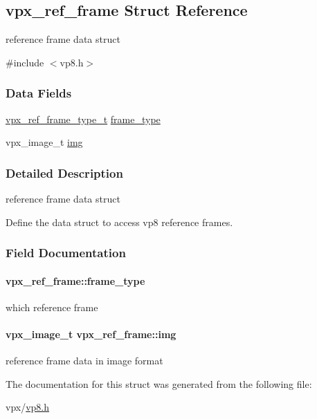 \hypertarget{structvpx__ref__frame}{\subsection{vpx\-\_\-ref\-\_\-frame \-Struct \-Reference}
\label{structvpx__ref__frame}
}


reference frame data struct  




{\ttfamily \#include $<$vp8.\-h$>$}

\subsubsection*{\-Data \-Fields}
\begin{DoxyCompactItemize}
\item 
\hyperlink{group__vp8_ga75ac0689a81bf7202382a225c5b451b4}{vpx\-\_\-ref\-\_\-frame\-\_\-type\-\_\-t} \hyperlink{structvpx__ref__frame_a7fbe51de592d0ff16d9fbd4d2b367c9b}{frame\-\_\-type}
\item 
vpx\-\_\-image\-\_\-t \hyperlink{structvpx__ref__frame_a972d24d0243f51f84eef7e1b79c6c414}{img}
\end{DoxyCompactItemize}


\subsubsection{\-Detailed \-Description}
reference frame data struct 

\-Define the data struct to access vp8 reference frames. 

\subsubsection{\-Field \-Documentation}
\hypertarget{structvpx__ref__frame_a7fbe51de592d0ff16d9fbd4d2b367c9b}{
\paragraph[{frame\-\_\-type}]{ {\bf vpx\-\_\-ref\-\_\-frame\-::frame\-\_\-type}}}\label{structvpx__ref__frame_a7fbe51de592d0ff16d9fbd4d2b367c9b}
which reference frame \hypertarget{structvpx__ref__frame_a972d24d0243f51f84eef7e1b79c6c414}{
\paragraph[{img}]{\setlength{\rightskip}{0pt plus 5cm}vpx\-\_\-image\-\_\-t {\bf vpx\-\_\-ref\-\_\-frame\-::img}}}\label{structvpx__ref__frame_a972d24d0243f51f84eef7e1b79c6c414}
reference frame data in image format 

\-The documentation for this struct was generated from the following file\-:\begin{DoxyCompactItemize}
\item 
vpx/\hyperlink{vp8_8h}{vp8.\-h}\end{DoxyCompactItemize}
